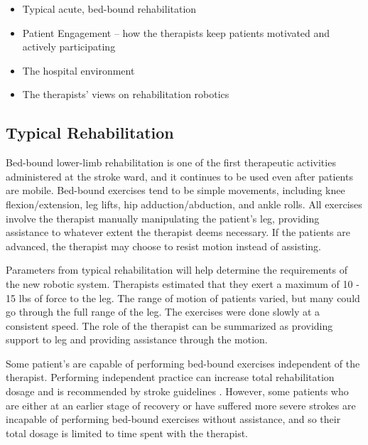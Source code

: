 \documentclass[12pt]{report}
\begin{document}
	\begin{itemize}
		\item Typical acute, bed-bound rehabilitation 
		\item Patient Engagement -- how the therapists keep patients motivated and actively participating 
		\item The hospital environment
		\item The therapists' views on rehabilitation robotics 
	\end{itemize}



	\subsection{Typical Rehabilitation}
	

	
	Bed-bound lower-limb rehabilitation is one of the first therapeutic activities administered at the stroke ward, and it continues to be used even after patients are mobile. Bed-bound exercises tend to be simple movements, including knee flexion/extension, leg lifts, hip adduction/abduction, and ankle rolls. All exercises involve the therapist manually manipulating the patient's leg, providing assistance to whatever extent the therapist deems necessary. If the patients are advanced, the therapist may choose to resist motion instead of assisting. 
	
	Parameters from typical rehabilitation will help determine the requirements of the new robotic system. Therapists estimated that they exert a maximum of 10 - 15 lbs of force to the leg. The range of motion of patients varied, but many could go through the full range of the leg. The exercises were done slowly at a consistent speed. The role of the therapist can be summarized as providing support to leg and providing assistance through the motion. 
	
	Some patient's are capable of performing bed-bound exercises independent of the therapist. Performing independent practice can increase total rehabilitation dosage and is recommended by stroke guidelines \cite{Hebert2016}. However, some patients who are either at an earlier stage of recovery or have suffered more severe strokes are incapable of performing bed-bound exercises without assistance, and so their total dosage is limited to time spent with the therapist. 
	
\end{document}
